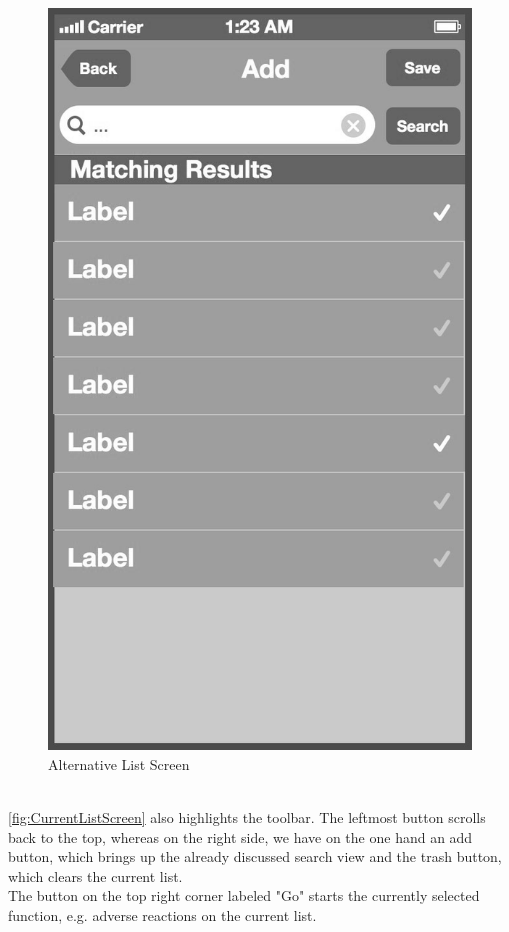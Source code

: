 \begin{figure}[!tb]
\begin{minipage}[b]{0.45\linewidth}
        \includegraphics[width=0.8025\linewidth]{figures/Screen_3_bw.jpg}
        \caption[List Screen to add to Current List]{Alternative List Screen}
        \label{fig:AlternativeListScreen}
    \end{minipage}
\end{figure}
\\
\ref{fig:CurrentListScreen} also highlights the toolbar. The leftmost button scrolls back to the top, whereas on the right side, we have on the one hand an add button, which brings up the already discussed search view and the trash button, which clears the current list. 
\\
The button on the top right corner labeled "Go" starts the currently selected function, e.g. adverse reactions on the current list.
\\
